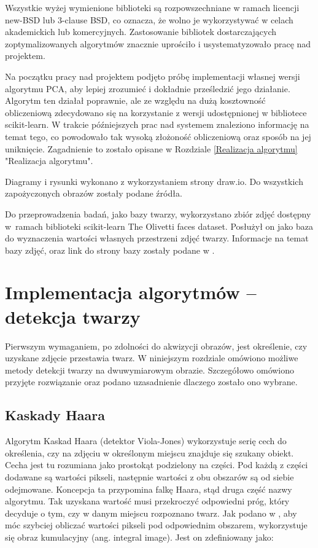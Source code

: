 \documentclass[oneside, eng]{mgr}
\begin{document}
Wszystkie wyżej wymienione biblioteki są rozpowszechniane w ramach licencji new-BSD lub 3-clause BSD, co oznacza, że wolno je wykorzystywać w celach akademickich lub komercyjnych. Zastosowanie bibliotek dostarczających zoptymalizowanych algorytmów znacznie uprościło i usystematyzowało pracę nad projektem.

Na początku pracy nad projektem podjęto próbę implementacji własnej wersji algorytmu PCA, aby lepiej zrozumieć i dokładnie prześledzić jego działanie. Algorytm ten działał poprawnie, ale ze względu na dużą kosztowność obliczeniową zdecydowano się na korzystanie z wersji udostępnionej w bibliotece scikit-learn. W trakcie późniejszych prac nad systemem znaleziono informację na temat tego, co powodowało tak wysoką złożoność obliczeniową oraz sposób na jej uniknięcie. Zagadnienie to zostało opisane w Rozdziale \ref{Realizacja algorytmu} "Realizacja algorytmu".

Diagramy i rysunki wykonano z wykorzystaniem strony draw.io. Do wszystkich zapożyczonych obrazów zostały podane źródła.

Do przeprowadzenia badań, jako bazy twarzy, wykorzystano zbiór zdjęć dostępny w~ramach biblioteki scikit-learn The Olivetti faces dataset. Posłużył on jako baza do wyznaczenia wartości własnych przestrzeni zdjęć twarzy. Informacje na temat bazy zdjęć, oraz link do strony bazy zostały podane w \cite{Olivetti faces}.


\newpage

\chapter{Implementacja algorytmów – detekcja twarzy}

Pierwszym wymaganiem, po zdolności do akwizycji obrazów, jest określenie, czy uzyskane zdjęcie przestawia twarz. W niniejszym rozdziale omówiono możliwe metody detekcji twarzy na dwuwymiarowym obrazie. Szczegółowo omówiono przyjęte rozwiązanie oraz podano uzasadnienie dlaczego zostało ono wybrane.

\section{Kaskady Haara}
Algorytm Kaskad Haara (detektor Viola-Jones) wykorzystuje serię cech do określenia, czy na zdjęciu w określonym miejscu znajduje się szukany obiekt. Cecha jest tu rozumiana jako prostokąt podzielony na części. Pod każdą z części dodawane są wartości pikseli, następnie wartości z obu obszarów są od siebie odejmowane. Koncepcja ta przypomina falkę Haara, stąd druga część nazwy algorytmu. Tak uzyskana wartość musi przekroczyć odpowiedni próg, który decyduje o tym, czy w danym miejscu rozpoznano twarz. Jak podano w \cite{Kaskada Haara}, aby móc szybciej obliczać wartości pikseli pod odpowiednim obszarem, wykorzystuje się obraz kumulacyjny (ang. integral image). Jest on zdefiniowany jako:
\end{document}
